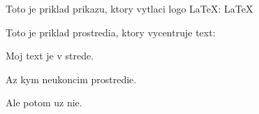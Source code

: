 \documentclass{book}
\begin{document}
Toto je priklad prikazu, ktory vytlaci logo LaTeX: \LaTeX

Toto je priklad prostredia, ktory vycentruje text:

\begin{center}
  Moj text je v strede.

  Az kym neukoncim prostredie.
\end{center}
Ale potom uz nie.
\end{document}
